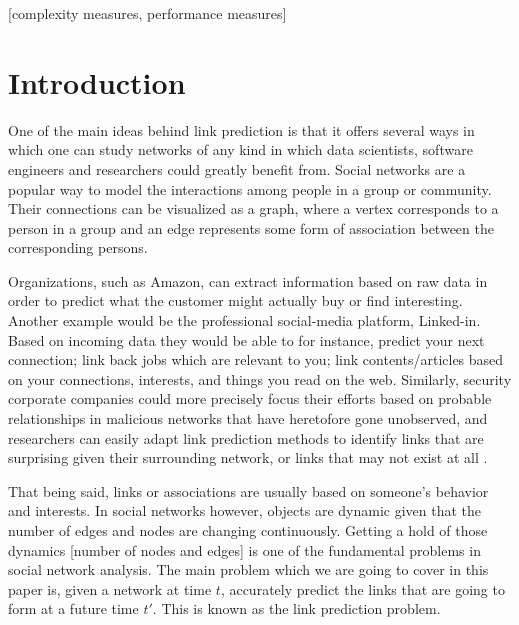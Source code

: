 \documentclass{acm_proc_article-sp}
\begin{document}
[complexity measures, performance measures]



\section{Introduction}
\label{Sect.1}

One of the main ideas behind link prediction is that it offers several ways in which one can study networks of any kind in which data scientists, software engineers and researchers could greatly benefit from. Social networks are a popular way to model the interactions among people in a group or community. Their connections can be visualized as a graph, where a vertex corresponds to a person in a group and an edge represents some form of association between the corresponding persons.

Organizations, such as Amazon, can extract information based on raw data in order to predict what the customer might actually buy or find interesting. Another example would be the professional social-media platform, Linked-in.  Based on incoming data they would be able to for instance, predict your next connection; link back jobs which are relevant to you; link contents/articles based on your connections, interests, and things you read on the web. Similarly, security corporate companies could more precisely focus their efforts based on probable relationships in malicious networks that have heretofore gone unobserved, and researchers can easily adapt link prediction methods to identify links that are surprising given their surrounding network, or links that may not exist at all \cite{Lichtenwalter:2010:NPM:1835804.1835837}. 

That being said, links or associations are usually based on someone's behavior and interests. In social networks however, objects are dynamic given that the number of edges and nodes are changing continuously. Getting a hold of those dynamics [number of nodes and edges] is one of the fundamental problems in social network analysis. The main problem which we are going to cover in this paper is, given a network at time $t$, accurately predict the links that are going to form at a future time $t'$. This is known as the link prediction problem.
\end{document}
